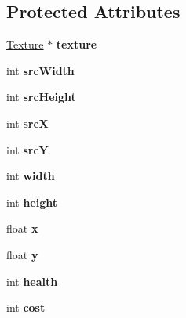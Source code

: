 \subsection*{Protected Attributes}
\begin{DoxyCompactItemize}
\item 
\hypertarget{class_entity_a94c6b2b4a46ea4885b5fa5859d7d68e7}{\hyperlink{class_texture}{Texture} $\ast$ {\bfseries texture}}\label{class_entity_a94c6b2b4a46ea4885b5fa5859d7d68e7}

\item 
\hypertarget{class_entity_a8a44ea56b660b9ac701d32931a066dce}{int {\bfseries src\+Width}}\label{class_entity_a8a44ea56b660b9ac701d32931a066dce}

\item 
\hypertarget{class_entity_a98172dbf203df1a9a7279a5e005eae08}{int {\bfseries src\+Height}}\label{class_entity_a98172dbf203df1a9a7279a5e005eae08}

\item 
\hypertarget{class_entity_a2871ef137e228ba7d431d5c65abcfd5c}{int {\bfseries src\+X}}\label{class_entity_a2871ef137e228ba7d431d5c65abcfd5c}

\item 
\hypertarget{class_entity_a24a5a921e7adf221357a6afd5ce5ec75}{int {\bfseries src\+Y}}\label{class_entity_a24a5a921e7adf221357a6afd5ce5ec75}

\item 
\hypertarget{class_entity_a58bf3e06b7431307e26c4adccae8cf11}{int {\bfseries width}}\label{class_entity_a58bf3e06b7431307e26c4adccae8cf11}

\item 
\hypertarget{class_entity_a5591f1e3ea630c4d8063038728587ab8}{int {\bfseries height}}\label{class_entity_a5591f1e3ea630c4d8063038728587ab8}

\item 
\hypertarget{class_entity_abc2d19ee6ff26b8520428894da6a8f68}{float {\bfseries x}}\label{class_entity_abc2d19ee6ff26b8520428894da6a8f68}

\item 
\hypertarget{class_entity_af4966f81d91cc8f8d5eb9e9002240c49}{float {\bfseries y}}\label{class_entity_af4966f81d91cc8f8d5eb9e9002240c49}

\item 
\hypertarget{class_entity_ab5bf0c97620636e04b271601e2133884}{int {\bfseries health}}\label{class_entity_ab5bf0c97620636e04b271601e2133884}

\item 
\hypertarget{class_entity_af0d86b6186484391164c2572c4a1be64}{int {\bfseries cost}}\label{class_entity_af0d86b6186484391164c2572c4a1be64}

\end{DoxyCompactItemize}


